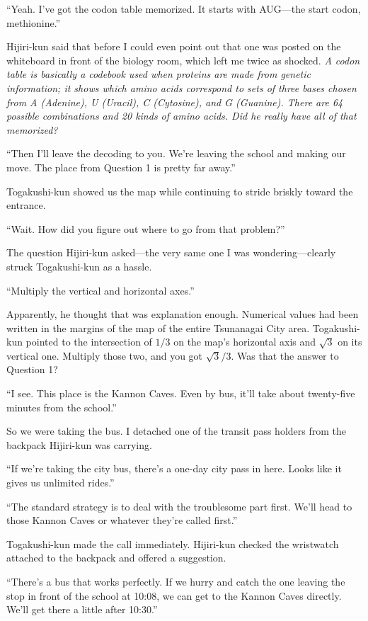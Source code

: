 \documentclass[
    a4paper,
    12pt,
    twoside,
    openany,
    UTF8,
    fontset=windows
]{ctexbook}
\begin{document}
``Yeah. I've got the codon table memorized. It starts with AUG---the start codon, methionine.''

Hijiri-kun said that before I could even point out that one was posted on the whiteboard in front of the biology room, which left me twice as shocked. \textit{A codon table is basically a codebook used when proteins are made from genetic information; it shows which amino acids correspond to sets of three bases chosen from A (Adenine), U (Uracil), C (Cytosine), and G (Guanine). There are 64 possible combinations and 20 kinds of amino acids. Did he really have all of that memorized?}

``Then I'll leave the decoding to you. We're leaving the school and making our move. The place from Question 1 is pretty far away.''

Togakushi-kun showed us the map while continuing to stride briskly toward the entrance.

``Wait. How did you figure out where to go from that problem?''

The question Hijiri-kun asked---the very same one I was wondering---clearly struck Togakushi-kun as a hassle.

``Multiply the vertical and horizontal axes.''

Apparently, he thought that was explanation enough. Numerical values had been written in the margins of the map of the entire Tsunanagai City area. Togakushi-kun pointed to the intersection of $1/3$ on the map's horizontal axis and $\sqrt{3}$ on its vertical one. Multiply those two, and you got $\sqrt{3}/3$. Was that the answer to Question 1?

``I see. This place is the Kannon Caves. Even by bus, it'll take about twenty-five minutes from the school.''

So we were taking the bus. I detached one of the transit pass holders from the backpack Hijiri-kun was carrying.

``If we're taking the city bus, there's a one-day city pass in here. Looks like it gives us unlimited rides.''

``The standard strategy is to deal with the troublesome part first. We'll head to those Kannon Caves or whatever they're called first.''

Togakushi-kun made the call immediately. Hijiri-kun checked the wristwatch attached to the backpack and offered a suggestion.

``There's a bus that works perfectly. If we hurry and catch the one leaving the stop in front of the school at 10:08, we can get to the Kannon Caves directly. We'll get there a little after 10:30.''
\end{document}
